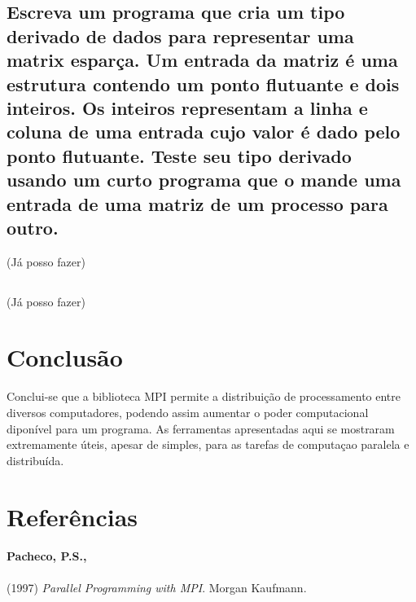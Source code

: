 \documentclass[11pt,a4paper,onecolumn]{article}
\begin{document}
\subsection{Escreva um programa que cria um tipo derivado de dados para representar uma matrix esparça. Um entrada da matriz é uma estrutura contendo um ponto flutuante e dois inteiros. Os inteiros representam a linha e coluna de uma entrada cujo valor é dado pelo ponto flutuante. Teste seu tipo derivado usando um curto programa que o mande uma entrada de uma matriz de um processo para outro.} (Já posso fazer)
%

\subsection{} (Já posso fazer)

\section{Conclusão}
Conclui-se que a biblioteca MPI permite a distribuição de processamento entre diversos computadores, podendo assim aumentar o poder computacional diponível para um programa.
As ferramentas apresentadas aqui se mostraram extremamente úteis, apesar de simples, para as tarefas de computaçao paralela e distribuída.

\section{Referências}
\paragraph{Pacheco, P.S.,} (1997) \textit{Parallel Programming with MPI}. Morgan Kaufmann.
\end{document}
